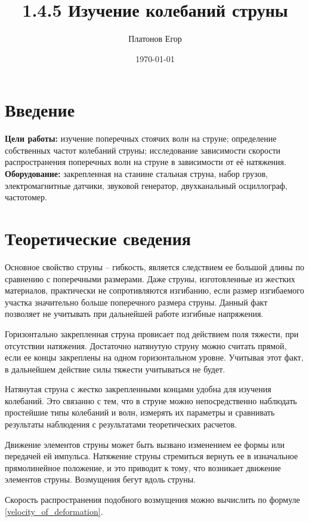 \documentclass[a4paper,12pt]{article}
\title{\textbf{1.4.5 Изучение колебаний струны}}
\author{Платонов Егор}
\date{\today}
\begin{document}
	
	\maketitle
	
	\section{Введение}
	
	\textbf{Цели работы:} изучение поперечных стоячих волн на струне; определение собственных частот колебаний струны; исследование зависимости скорости распространения поперечных волн на струне в зависимости от её натяжения.\\
	\textbf{Оборудование:} закрепленная на станине стальная струна, набор грузов,
	электромагнитные датчики, звуковой генератор, двухканальный осциллограф, частотомер.
	
	\section{Теоретические сведения}
	
	Основное свойство струны -- гибкость, является следствием ее большой длины по сравнению с поперечными размерами. Даже струны, изготовленные из жестких материалов, практически не сопротивляются изгибанию, если размер изгибаемого участка значительно больше поперечного размера струны. Данный факт позволяет не учитывать при дальнейшей работе изгибные напряжения.
	
	Горизонтально закрепленная струна провисает под действием поля тяжести, при отсутствии натяжения. Достаточно натянутую струну можно считать прямой, если ее концы закреплены на одном горизонтальном уровне. Учитывая этот факт, в дальнейшем действие силы тяжести учитываться не будет.
	
	Натянутая струна с жестко закрепленными концами удобна для изучения колебаний. Это связанно с тем, что в струне можно непосредственно наблюдать простейшие типы колебаний и волн, измерять их параметры и сравнивать результаты наблюдения с результатами теоретических расчетов.
	
	Движение элементов струны может быть вызвано изменением ее формы или передачей ей импульса. Натяжение струны стремиться вернуть ее в изначальное прямолинейное положение, и это приводит к тому, что возникает движение элементов струны. Возмущения бегут вдоль струны.
	
	Скорость распространения подобного возмущения можно вычислить по формуле \eqref{velocity_of_deformation}.
	
\end{document}
